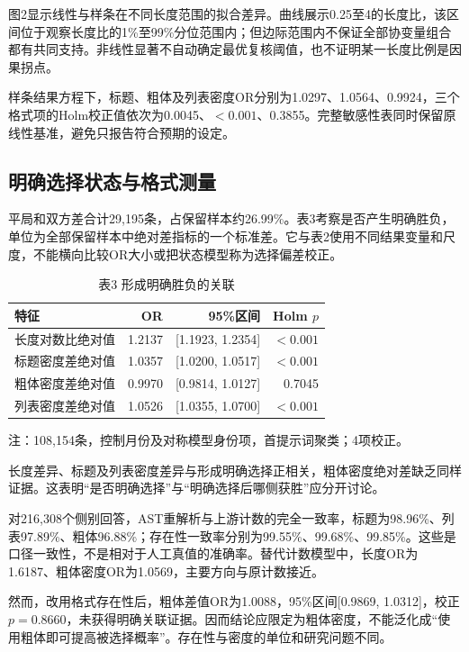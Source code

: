 \documentclass[UTF8,11pt,a4paper,fontset=windows]{ctexart}
\numberwithin{equation}{section}
\begin{document}
图2显示线性与样条在不同长度范围的拟合差异。曲线展示0.25至4的长度比，该区间位于观察长度比的1\%至99\%分位范围内；但边际范围内不保证全部协变量组合都有共同支持。非线性显著不自动确定最优复核阈值，也不证明某一长度比例是因果拐点。

样条结果方程下，标题、粗体及列表密度OR分别为1.0297、1.0564、0.9924，三个格式项的Holm校正值依次为0.0045、$<0.001$、0.3855。完整敏感性表同时保留原线性基准，避免只报告符合预期的设定。

\subsection{明确选择状态与格式测量}
平局和双方差合计29,195条，占保留样本约26.99\%。表3考察是否产生明确胜负，单位为全部保留样本中绝对差指标的一个标准差。它与表2使用不同结果变量和尺度，不能横向比较OR大小或把状态模型称为选择偏差校正。

\begin{table}[htbp]\centering\small\caption{表3 形成明确胜负的关联}\label{tab:decisive}
\begin{tabular}{lrrr}\toprule
特征 & OR & 95\%区间 & Holm $p$\\\midrule
长度对数比绝对值 & 1.2137 & [1.1923, 1.2354] & $<0.001$\\
标题密度差绝对值 & 1.0357 & [1.0200, 1.0517] & $<0.001$\\
粗体密度差绝对值 & 0.9970 & [0.9814, 1.0127] & 0.7045\\
列表密度差绝对值 & 1.0526 & [1.0355, 1.0700] & $<0.001$\\\bottomrule\end{tabular}
\par\smallskip\footnotesize 注：108,154条，控制月份及对称模型身份项，首提示词聚类；4项校正。
\end{table}

长度差异、标题及列表密度差异与形成明确选择正相关，粗体密度绝对差缺乏同样证据。这表明“是否明确选择”与“明确选择后哪侧获胜”应分开讨论。

对216,308个侧别回答，AST重解析与上游计数的完全一致率，标题为98.96\%、列表97.89\%、粗体96.88\%；存在性一致率分别为99.55\%、99.68\%、99.85\%。这些是口径一致性，不是相对于人工真值的准确率。替代计数模型中，长度OR为1.6187、粗体密度OR为1.0569，主要方向与原计数接近。

然而，改用格式存在性后，粗体差值OR为1.0088，95\%区间[0.9869, 1.0312]，校正$p=0.8660$，未获得明确关联证据。因而结论应限定为粗体密度，不能泛化成“使用粗体即可提高被选择概率”。存在性与密度的单位和研究问题不同。
\end{document}
